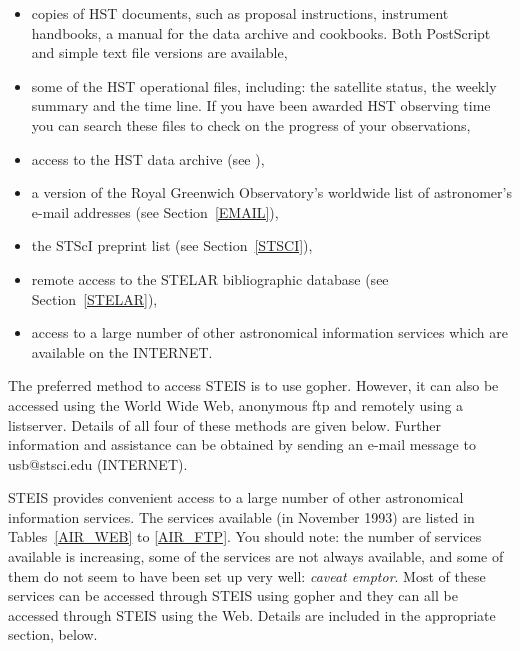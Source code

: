 \begin{itemize}

  \item copies of HST documents, such as proposal instructions, 
   instrument handbooks, a manual for the data archive and cookbooks.
   Both PostScript and simple text file versions are available,

  \item some of the HST operational files, including: the satellite
   status, the weekly summary and the time line. If you have been 
   awarded HST observing time you can search these files to check on 
   the progress of your observations,

  \item access to the HST data archive (see ),

  \item a version of the Royal Greenwich Observatory's worldwide list 
   of astronomer's e-mail addresses (see Section~\ref{EMAIL}),

  \item the STScI preprint list (see Section~\ref{STSCI}),

  \item remote access to the STELAR bibliographic database (see 
   Section~\ref{STELAR}),

  \item access to a large number of other astronomical information
   services which are available on the INTERNET.

\end{itemize}

The preferred method to access STEIS is to use gopher. However, it can
also be accessed using the World Wide Web, anonymous ftp and remotely 
using a listserver. Details of all four of these methods are given 
below. Further information and assistance can be obtained by sending an 
e-mail message to usb@stsci.edu (INTERNET).

STEIS provides convenient access to a large number of other astronomical
information services. The services available (in November 1993) are 
listed in Tables~\ref{AIR_WEB} to \ref{AIR_FTP}. You should note: the
number of services available is increasing, some of the services are not
always available, and some of them do not seem to have been set up very 
well: {\it caveat emptor}. Most of these services can be accessed 
through STEIS using gopher and they can all be accessed through STEIS 
using the Web. Details are included in the appropriate section, below.

